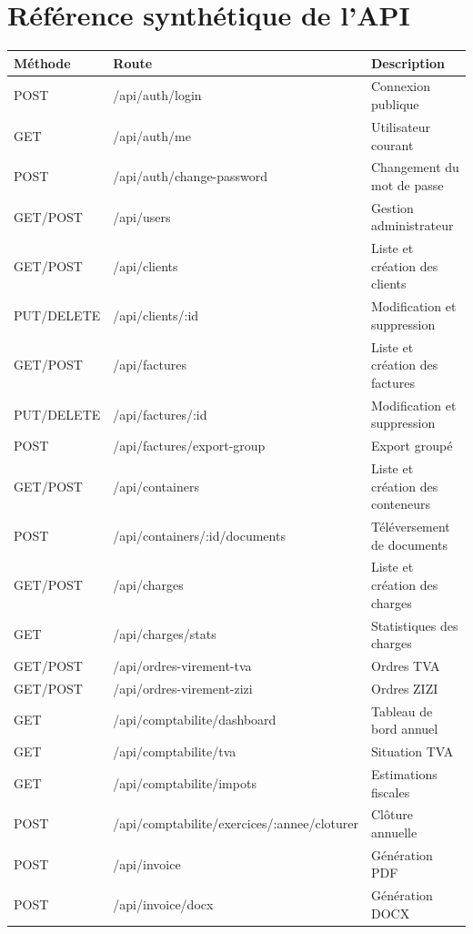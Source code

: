 \documentclass[12pt,a4paper,oneside]{report}
\begin{document}
\chapter{Référence synthétique de l'API}
\begin{longtable}{p{1.7cm}p{7.2cm}p{6cm}}
\toprule \textbf{Méthode} & \textbf{Route} & \textbf{Description}\\ \midrule
POST & /api/auth/login & Connexion publique\\
GET & /api/auth/me & Utilisateur courant\\
POST & /api/auth/change-password & Changement du mot de passe\\
GET/POST & /api/users & Gestion administrateur\\
GET/POST & /api/clients & Liste et création des clients\\
PUT/DELETE & /api/clients/:id & Modification et suppression\\
GET/POST & /api/factures & Liste et création des factures\\
PUT/DELETE & /api/factures/:id & Modification et suppression\\
POST & /api/factures/export-group & Export groupé\\
GET/POST & /api/containers & Liste et création des conteneurs\\
POST & /api/containers/:id/documents & Téléversement de documents\\
GET/POST & /api/charges & Liste et création des charges\\
GET & /api/charges/stats & Statistiques des charges\\
GET/POST & /api/ordres-virement-tva & Ordres TVA\\
GET/POST & /api/ordres-virement-zizi & Ordres ZIZI\\
GET & /api/comptabilite/dashboard & Tableau de bord annuel\\
GET & /api/comptabilite/tva & Situation TVA\\
GET & /api/comptabilite/impots & Estimations fiscales\\
POST & /api/comptabilite/exercices/:annee/cloturer & Clôture annuelle\\
POST & /api/invoice & Génération PDF\\
POST & /api/invoice/docx & Génération DOCX\\
\bottomrule
\end{longtable}
\end{document}
